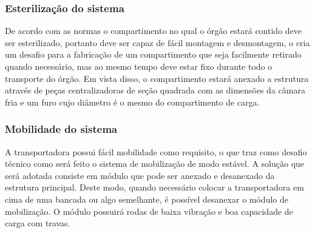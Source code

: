 \subsubsection{Esterilização do sistema}
De acordo com as normas o compartimento no qual o órgão estará contido deve ser esterilizado, portanto deve ser capaz de fácil montagem e desmontagem, o cria um desafio para a fabricação de um compartimento que seja facilmente retirado quando necessário, mas ao mesmo tempo deve estar fixo durante todo o transporte do órgão. Em vista disso, o compartimento estará anexado a estrutura através de peças centralizadoras de seção quadrada com as dimensões da câmara fria e um furo cujo diâmetro é o mesmo do compartimento de carga.
         
\subsubsection{Mobilidade do sistema}
A transportadora possui fácil mobilidade como requisito, o que traz como desafio técnico como será feito o sistema de mobilização de modo estável. A solução que será adotada consiste em módulo que pode ser anexado e desanexado da estrutura principal. Deste modo, quando necessário colocar a transportadora em cima de uma bancada ou algo semelhante, é possível desanexar o módulo de mobilização. O módulo possuirá rodas de baixa vibração e boa capacidade de carga com travas.